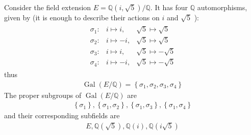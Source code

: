 \documentclass{article}
\begin{document}
\begin{exma}
Consider the field extension $E=\mathbb{Q}(i, \sqrt{5}) / \mathbb{Q}$. It has four $\mathbb{Q}$ automorphisms, given by (it is enough to describe their actions on $i$ and $\sqrt{5}$ ):
\begin{align*}
\begin{array}{ccc}
\sigma_{1}: & i \mapsto i, & \sqrt{5} \mapsto \sqrt{5} \\
\sigma_{2}: & i \mapsto-i, & \sqrt{5} \mapsto \sqrt{5} \\
\sigma_{3}: & i \mapsto i, & \sqrt{5} \mapsto-\sqrt{5} \\
\sigma_{4}: & i \mapsto-i, & \sqrt{5} \mapsto-\sqrt{5}
\end{array}
\end{align*}
thus
\begin{align*}
\operatorname{Gal}(E / \mathbb{Q})=\left\{\sigma_{1}, \sigma_{2}, \sigma_{3}, \sigma_{4}\right\}
\end{align*}
The proper subgroups of $\operatorname{Gal}(E / \mathbb{Q})$ are
\begin{align*}
\left\{\sigma_{1}\right\},\left\{\sigma_{1}, \sigma_{2}\right\},\left\{\sigma_{1}, \sigma_{3}\right\},\left\{\sigma_{1}, \sigma_{4}\right\}
\end{align*}
and their corresponding subfields are
\begin{align*}
E, \mathbb{Q}(\sqrt{5}), \mathbb{Q}(i), \mathbb{Q}(i \sqrt{5})
\end{align*}
\end{exma} 
\end{document}
